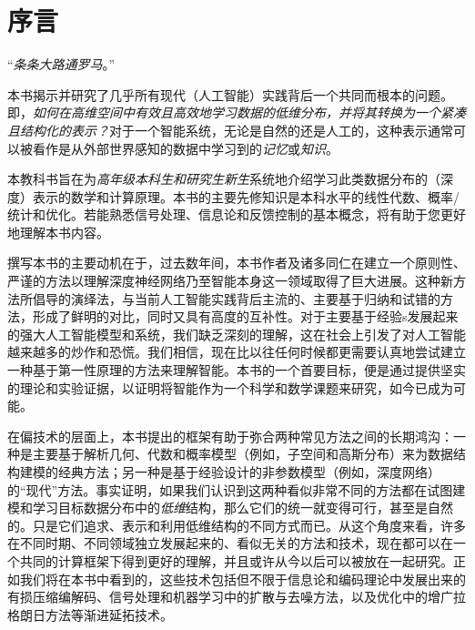 \documentclass[../../book-main.tex]{subfiles}
\begin{document}
\chapter*{序言}

\begin{center}
``{\em 条条大路通罗马}。''

\end{center}
\vspace{5mm}

本书揭示并研究了几乎所有现代（人工智能）实践背后一个共同而根本的问题。即，{\em 如何在高维空间中有效且高效地学习数据的低维分布，并将其转换为一个紧凑且结构化的表示？}对于一个智能系统，无论是自然的还是人工的，这种表示通常可以被看作是从外部世界感知的数据中学习到的{\em 记忆}或{\em 知识}。

本教科书旨在为{\em 高年级本科生和研究生新生}系统地介绍学习此类数据分布的（深度）表示的数学和计算原理。本书的主要先修知识是本科水平的线性代数、概率/统计和优化。若能熟悉信号处理、信息论和反馈控制的基本概念，将有助于您更好地理解本书内容。

撰写本书的主要动机在于，过去数年间，本书作者及诸多同仁在建立一个原则性、严谨的方法以理解深度神经网络乃至智能本身这一领域取得了巨大进展。这种新方法所倡导的演绎法，与当前人工智能实践背后主流的、主要基于归纳和试错的方法，形成了鲜明的对比，同时又具有高度的互补性。对于主要基于经验s发展起来的强大人工智能模型和系统，我们缺乏深刻的理解，这在社会上引发了对人工智能越来越多的炒作和恐慌。我们相信，现在比以往任何时候都更需要认真地尝试建立一种基于第一性原理的方法来理解智能。本书的一个首要目标，便是通过提供坚实的理论和实验证据，以证明将智能作为一个科学和数学课题来研究，如今已成为可能。

在偏技术的层面上，本书提出的框架有助于弥合两种常见方法之间的长期鸿沟：一种是主要基于解析几何、代数和概率模型（例如，子空间和高斯分布）来为数据结构建模的经典方法；另一种是基于经验设计的非参数模型（例如，深度网络）的“现代”方法。事实证明，如果我们认识到这两种看似非常不同的方法都在试图建模和学习目标数据分布中的{\em 低维}结构，那么它们的统一就变得可行，甚至是自然的。只是它们追求、表示和利用低维结构的不同方式而已。从这个角度来看，许多在不同时期、不同领域独立发展起来的、看似无关的方法和技术，现在都可以在一个共同的计算框架下得到更好的理解，并且或许从今以后可以被放在一起研究。正如我们将在本书中看到的，这些技术包括但不限于信息论和编码理论中发展出来的有损压缩编解码、信号处理和机器学习中的扩散与去噪方法，以及优化中的增广拉格朗日方法等渐进延拓技术。
\end{document}
